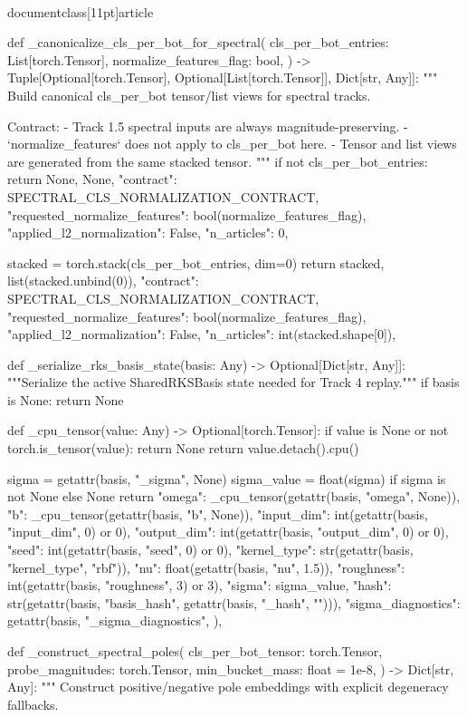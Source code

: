 \\documentclass[11pt]{article}
\begin{document}
\begin{CodeBlock}
def _canonicalize_cls_per_bot_for_spectral(
    cls_per_bot_entries: List[torch.Tensor],
    normalize_features_flag: bool,
) -> Tuple[Optional[torch.Tensor], Optional[List[torch.Tensor]], Dict[str, Any]]:
    """
    Build canonical cls_per_bot tensor/list views for spectral tracks.

    Contract:
      - Track 1.5 spectral inputs are always magnitude-preserving.
      - `normalize_features` does not apply to cls_per_bot here.
      - Tensor and list views are generated from the same stacked tensor.
    """
    if not cls_per_bot_entries:
        return None, None, {
            "contract": SPECTRAL_CLS_NORMALIZATION_CONTRACT,
            "requested_normalize_features": bool(normalize_features_flag),
            "applied_l2_normalization": False,
            "n_articles": 0,
        }

    stacked = torch.stack(cls_per_bot_entries, dim=0)
    return stacked, list(stacked.unbind(0)), {
        "contract": SPECTRAL_CLS_NORMALIZATION_CONTRACT,
        "requested_normalize_features": bool(normalize_features_flag),
        "applied_l2_normalization": False,
        "n_articles": int(stacked.shape[0]),
    }


def _serialize_rks_basis_state(basis: Any) -> Optional[Dict[str, Any]]:
    """Serialize the active SharedRKSBasis state needed for Track 4 replay."""
    if basis is None:
        return None

    def _cpu_tensor(value: Any) -> Optional[torch.Tensor]:
        if value is None or not torch.is_tensor(value):
            return None
        return value.detach().cpu()

    sigma = getattr(basis, "_sigma", None)
    sigma_value = float(sigma) if sigma is not None else None
    return {
        "omega": _cpu_tensor(getattr(basis, "omega", None)),
        "b": _cpu_tensor(getattr(basis, "b", None)),
        "input_dim": int(getattr(basis, "input_dim", 0) or 0),
        "output_dim": int(getattr(basis, "output_dim", 0) or 0),
        "seed": int(getattr(basis, "seed", 0) or 0),
        "kernel_type": str(getattr(basis, "kernel_type", "rbf")),
        "nu": float(getattr(basis, "nu", 1.5)),
        "roughness": int(getattr(basis, "roughness", 3) or 3),
        "sigma": sigma_value,
        "hash": str(getattr(basis, "basis_hash", getattr(basis, "_hash", ""))),
        "sigma_diagnostics": getattr(basis, "_sigma_diagnostics", {}),
    }


def _construct_spectral_poles(
    cls_per_bot_tensor: torch.Tensor,
    probe_magnitudes: torch.Tensor,
    min_bucket_mass: float = 1e-8,
) -> Dict[str, Any]:
    """
    Construct positive/negative pole embeddings with explicit degeneracy fallbacks.


\end{CodeBlock}
\end{document}
